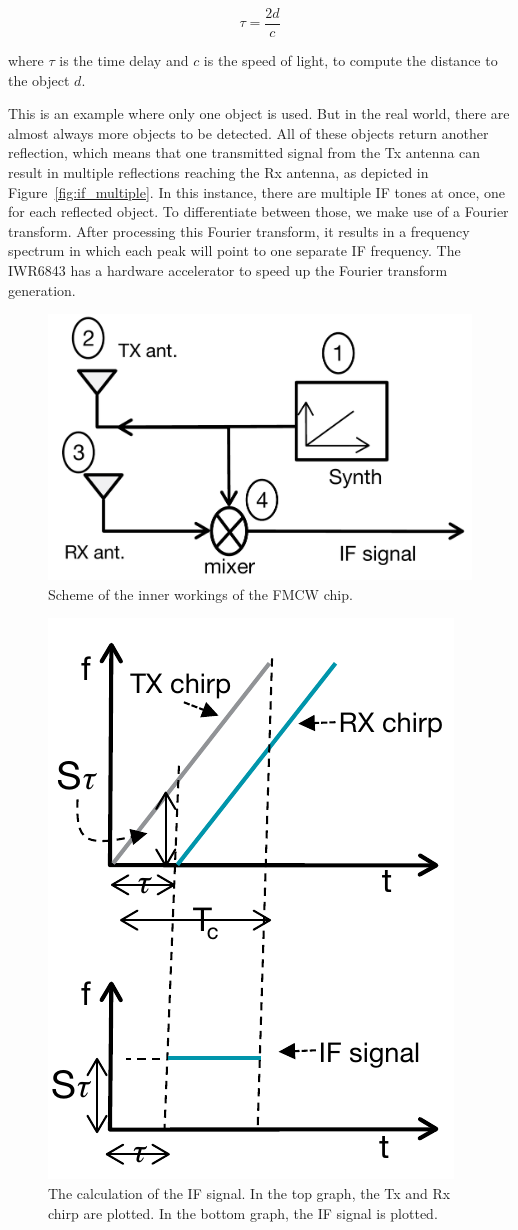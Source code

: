 \begin{equation}
\tau = \frac{2d}{c}
\label{eq:range_equation}
\end{equation}

where $\tau$ is the time delay and $c$ is the speed of light, to compute the distance to the object $d$. 

This is an example where only one object is used. But in the real world, there are almost always more objects to be detected. All of these objects return another reflection, which means that one transmitted signal from the Tx antenna can result in multiple reflections reaching the Rx antenna, as depicted in Figure~\ref{fig:if_multiple}. In this instance, there are multiple IF tones at once, one for each reflected object. To differentiate between those, we make use of a Fourier transform. After processing this Fourier transform, it results in a frequency spectrum in which each peak will point to one separate IF frequency. The IWR6843 has a hardware accelerator to speed up the Fourier transform generation.


\begin{figure}[t]
\centering
\includegraphics[width=.5\textwidth]{figures/background/fmcw_internals.png}
\caption{Scheme of the inner workings of the FMCW chip.}
\label{fig:fmcw_inner}
\end{figure}

\begin{figure}[t]
\centering
\includegraphics[width=.5\textwidth]{figures/background/if_signal.png}
\caption{The calculation of the IF signal. In the top graph, the Tx and Rx chirp are plotted. In the bottom graph, the IF signal is plotted.}
\label{fig:if_signal}
\end{figure}


